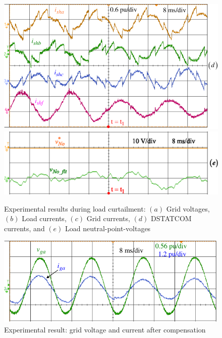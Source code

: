 \begin{figure}
	\centering
	\includegraphics[scale=0.84]{figures/Chapter_4/Mine/FilterCurrents.pdf}\\ 
	\label{4.filtercurrents}
	\centering
	\includegraphics[scale=0.84]{figures/Chapter_4/Mine/LoadNPV.eps}\\ 
	\label{4.LoadNPV}
	\caption{Experimental results during load curtailment: $(a)$ Grid voltages, $(b)$ Load currents, $(c)$ Grid currents, $(d)$ DSTATCOM currents, and $(e)$ Load neutral-point-voltages}  
	\label{fig4.7}
\end{figure}
\begin{figure}   
	\centering
	\includegraphics[scale=0.9]{figures/Chapter_4/Mine/UPF.pdf}
	\caption{Experimental result: grid voltage and current after compensation} 
	\label{fig4.9}
\end{figure}
